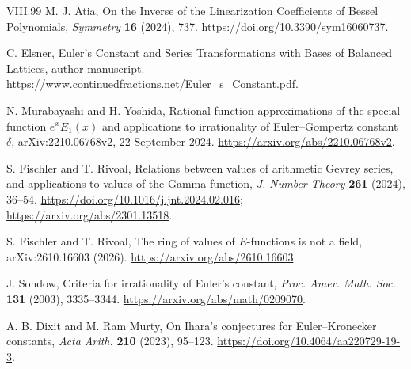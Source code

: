 \documentclass[11pt,a4paper]{article}
\theoremstyle{definition}
\theoremstyle{remark}
\numberwithin{equation}{section}
\begin{document}
\begin{thebibliography}{VIII.99}
M. J. Atia, On the Inverse of the Linearization Coefficients of Bessel
Polynomials, \emph{Symmetry} \textbf{16} (2024), 737.
\url{https://doi.org/10.3390/sym16060737}.

C. Elsner, Euler's Constant and Series Transformations with Bases of
Balanced Lattices, author manuscript.
\url{https://www.continuedfractions.net/Euler_s_Constant.pdf}.

N. Murabayashi and H. Yoshida, Rational function approximations of the
special function $e^xE_1(x)$ and applications to irrationality of
Euler--Gompertz constant $\delta$, arXiv:2210.06768v2,
22 September 2024.
\url{https://arxiv.org/abs/2210.06768v2}.

S. Fischler and T. Rivoal, Relations between values of arithmetic
Gevrey series, and applications to values of the Gamma function,
\emph{J. Number Theory} \textbf{261} (2024), 36--54.
\url{https://doi.org/10.1016/j.jnt.2024.02.016};
\url{https://arxiv.org/abs/2301.13518}.

S. Fischler and T. Rivoal, The ring of values of $E$-functions is not
a field, arXiv:2610.16603 (2026).
\url{https://arxiv.org/abs/2610.16603}.

J. Sondow, Criteria for irrationality of Euler's constant,
\emph{Proc. Amer. Math. Soc.} \textbf{131} (2003), 3335--3344.
\url{https://arxiv.org/abs/math/0209070}.

A. B. Dixit and M. Ram Murty, On Ihara's conjectures for Euler--Kronecker
constants, \emph{Acta Arith.} \textbf{210} (2023), 95--123.
\url{https://doi.org/10.4064/aa220729-19-3}.
\end{thebibliography}
\label{part8:end}
\end{document}
